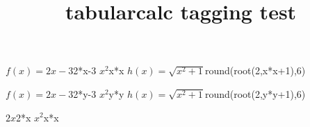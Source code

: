 \documentclass{article}
\title{tabularcalc tagging test}
\begin{document}
              {$f(x)=2x-3$}{2*x-3}
              {$x^2$}{x*x}
              {$h(x)=\sqrt{x^2+1}$}{round(root(2,x*x+1),6)}

\bigskip

              {$f(x)=2x-3$}{2*y-3}
              {$x^2$}{y*y}
              {$h(x)=\sqrt{x^2+1}$}{round(root(2,y*y+1),6)}

\bigskip

              {$2x$}{2*x}
              {$x^2$}{x*x}
           
\end{document}
